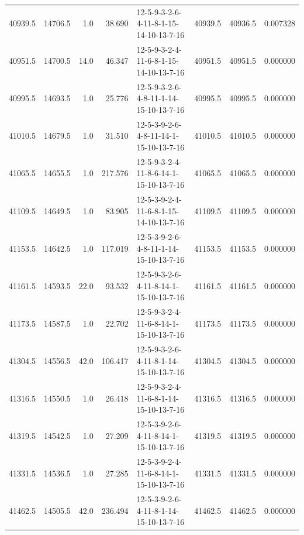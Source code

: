 \begin{tabular}{rrrrlrrr}
 40939.5 &  14706.5 &            1.0 &             38.690 &  12-5-9-3-2-6-4-11-8-1-15-14-10-13-7-16 &       40939.5 &         40936.5 &  0.007328 \\
 40951.5 &  14700.5 &           14.0 &             46.347 &  12-5-9-3-2-4-11-6-8-1-15-14-10-13-7-16 &       40951.5 &         40951.5 &  0.000000 \\
 40995.5 &  14693.5 &            1.0 &             25.776 &  12-5-9-3-2-6-4-8-11-1-14-15-10-13-7-16 &       40995.5 &         40995.5 &  0.000000 \\
 41010.5 &  14679.5 &            1.0 &             31.510 &  12-5-3-9-2-6-4-8-11-14-1-15-10-13-7-16 &       41010.5 &         41010.5 &  0.000000 \\
 41065.5 &  14655.5 &            1.0 &            217.576 &  12-5-9-3-2-4-11-8-6-14-1-15-10-13-7-16 &       41065.5 &         41065.5 &  0.000000 \\
 41109.5 &  14649.5 &            1.0 &             83.905 &  12-5-3-9-2-4-11-6-8-1-15-14-10-13-7-16 &       41109.5 &         41109.5 &  0.000000 \\
 41153.5 &  14642.5 &            1.0 &            117.019 &  12-5-3-9-2-6-4-8-11-1-14-15-10-13-7-16 &       41153.5 &         41153.5 &  0.000000 \\
 41161.5 &  14593.5 &           22.0 &             93.532 &  12-5-9-3-2-6-4-11-8-14-1-15-10-13-7-16 &       41161.5 &         41161.5 &  0.000000 \\
 41173.5 &  14587.5 &            1.0 &             22.702 &  12-5-9-3-2-4-11-6-8-14-1-15-10-13-7-16 &       41173.5 &         41173.5 &  0.000000 \\
 41304.5 &  14556.5 &           42.0 &            106.417 &  12-5-9-3-2-6-4-11-8-1-14-15-10-13-7-16 &       41304.5 &         41304.5 &  0.000000 \\
 41316.5 &  14550.5 &            1.0 &             26.418 &  12-5-9-3-2-4-11-6-8-1-14-15-10-13-7-16 &       41316.5 &         41316.5 &  0.000000 \\
 41319.5 &  14542.5 &            1.0 &             27.209 &  12-5-3-9-2-6-4-11-8-14-1-15-10-13-7-16 &       41319.5 &         41319.5 &  0.000000 \\
 41331.5 &  14536.5 &            1.0 &             27.285 &  12-5-3-9-2-4-11-6-8-14-1-15-10-13-7-16 &       41331.5 &         41331.5 &  0.000000 \\
 41462.5 &  14505.5 &           42.0 &            236.494 &  12-5-3-9-2-6-4-11-8-1-14-15-10-13-7-16 &       41462.5 &         41462.5 &  0.000000 \\

\end{tabular}
